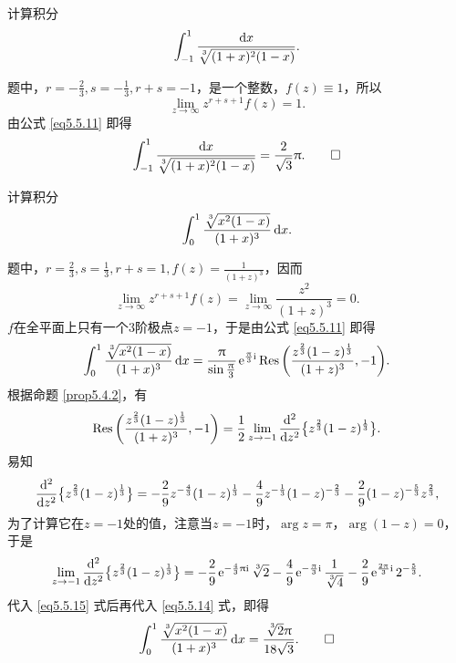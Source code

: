 \begin{example}\label{exam5.5.16}
  计算积分
  \[
    \int_{-1}^1\frac{\dx}{\sqrt[\leftroot{-1}\uproot{2}3]{(1+x)^2(1-x)}}.
  \]
\end{example}
\begin{solution}
  题中，$r=-\frac23,s=-\frac13,r+s=-1$，是一个整数，$f(z)\equiv1$，所以
  \[
    \lim_{z\to\infty}z^{r+s+1}f(z) = 1.
  \]
  由公式 \eqref{eq5.5.11} 即得
  \begin{equation*}
    \int_{-1}^1\frac{\dx}{\sqrt[\leftroot{-1}\uproot{2}3]{(1+x)^2(1-x)}} = \frac2{\sqrt3}\pi. \qedhere
  \end{equation*}
\end{solution}
\begin{example}\label{exam5.5.17}
  计算积分
  \[
    \int_0^1\frac{\sqrt[\leftroot{-1}\uproot{2}3]{x^2(1-x)}}{(1+x)^3}\dx.
  \]
\end{example}
\begin{solution}
  题中，$r=\frac23,s=\frac13,r+s=1,f(z)=\frac1{(1+z)^3}$，因而
  \[
    \lim_{z\to\infty}z^{r+s+1}f(z) = \lim_{z\to\infty}\frac{z^2}{(1+z)^3} = 0.
  \]
  $f$在全平面上只有一个$3$阶极点$z=-1$，于是由公式 \eqref{eq5.5.11} 即得
  \begin{equation}\label{eq5.5.14}
    \int_0^1\frac{\sqrt[\leftroot{-1}\uproot{2}3]{x^2(1-x)}}{(1+x)^3}\dx
    = \frac\pi{\sin\frac\pi3}\ee^{\frac\pi3\ii}\Res
    \bigg(\frac{z^{\frac23}(1-z)^{\frac13}}{(1+z)^3},-1\bigg).
  \end{equation}
  根据命题 \ref{prop5.4.2}，有
  \begin{equation}\label{eq5.5.15}
    \operatorname*{Res}\bigg(\frac{z^{\frac23}(1-z)^{\frac13}}{(1+z)^3},-1\bigg) = \frac12
    \lim_{z\to-1}\frac{\mathop{}\!\mathrm d^2}{\mathop{}\!\mathrm dz^2}\big\{z^{\frac23}(1-z)^{\frac13}\big\}.
  \end{equation}
  易知
  \[
    \frac{\mathop{}\!\mathrm d^2}{\mathop{}\!\mathrm dz^2}\big\{z^{\frac23}(1-z)^{\frac13}\big\} = -\frac29z^{-\frac43}(1-z)^{\frac13}
    -\frac49z^{-\frac13}(1-z)^{-\frac23}-\frac29(1-z)^{-\frac53}z^{\frac23},
  \]
  为了计算它在$z=-1$处的值，注意当$z=-1$时，$\arg z=\pi$，$\arg(1-z)=0$，于是
  \[
    \lim_{z\to-1}\ddd{}z\big\{z^{\frac23}(1-z)^{\frac13}\big\}
    = -\frac29\ee^{-\frac43\pi\ii}\sqrt[\leftroot{-1}\uproot{2}3]2-
    \frac49\ee^{-\frac\pi3\ii}\frac1{\sqrt[\leftroot{-1}\uproot{2}3]4}-
    \frac29\ee^{\frac{2\pi}3\ii}2^{-\frac53}.
  \]
  代入 \eqref{eq5.5.15} 式后再代入 \eqref{eq5.5.14} 式，即得
  \begin{equation*}
    \int_0^1\frac{\sqrt[\leftroot{-1}\uproot{2}3]{x^2(1-x)}}{(1+x)^3}\dx
    =\frac{\sqrt[\leftroot{-1}\uproot{2}3]2\pi}{18\sqrt3}. \qedhere
  \end{equation*}
\end{solution}

